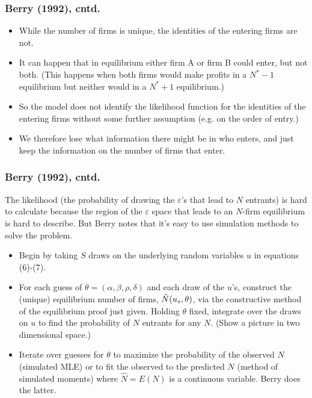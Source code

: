 \documentclass[xcolor=pdftex,dvipsnames,table,mathserif]{beamer}
\begin{document}
\begin{frame}
\frametitle{Berry (1992), cntd.}
\begin{itemize}
\item While the number of firms is unique, the identities of the entering
firms are not.

\item It can happen that in equilibrium either firm A or firm B could enter,
but not both. (This happens when both firms would make profits in a $N^{\ast
}-1$ equilibrium but neither would in a $N^{\ast }+1$ equilibrium.)

\item So the model does not identify the likelihood function for the
identities of the entering firms without some further assumption (e.g. on
the order of entry.)

\item We therefore lose what information there might be in who enters, and
just keep the information on the number of firms that enter.
\end{itemize}

\end{frame}

\begin{frame}
\frametitle{Berry (1992), cntd.}
\footnotesize
The likelihood (the probability of drawing the $\varepsilon $'s that lead to 
$N$ entrants) is hard to calculate because the region of the $\varepsilon $
space that leads to an $N$-firm equilibrium is hard to describe. But Berry
notes that it's easy to use simulation methods to solve the problem.
\begin{itemize}
\item Begin by taking $S$ draws on the underlying random variables $u$ in
equations (6)-(7).
\item For each guess of $\theta =(\alpha ,\beta ,\rho ,\delta )$ and each
draw of the $u$'s, construct the (unique) equilibrium number of firms, $\hat{%
N}(u_{s},\theta )$, via the constructive method of the equilibrium proof
just given. Holding $\theta $ fixed, integrate over the draws on $u$ to find
the probability of $N$ entrants for any $N$. (Show a picture in two
dimensional space.)
\item Iterate over guesses for $\theta $ to maximize the probability of the
observed $N$ (simulated MLE) or to fit the observed to the predicted $N$
(method of simulated moments) where $\hat{N}=E(N)$ is a continuous variable.
Berry does the latter.
\end{itemize}
\end{frame}
\end{document}
